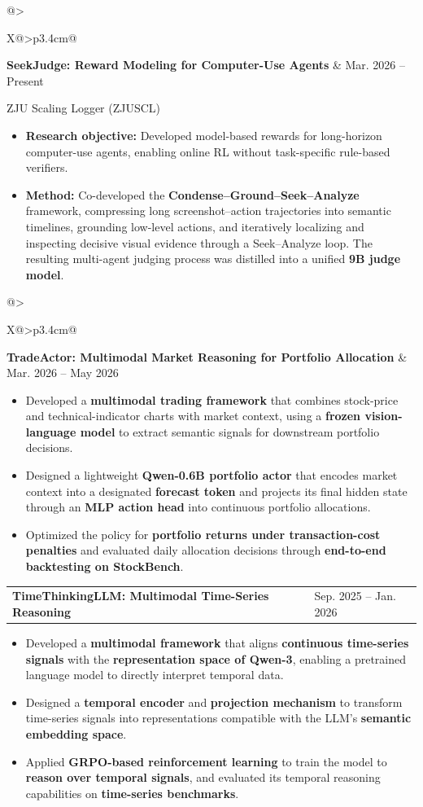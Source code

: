 \documentclass[11pt]{article}
\makeatletter
\newcommand{\cvheading}[2]{%
    \par\noindent
    \begin{tabularx}{\linewidth}{@{}>{\raggedright\arraybackslash}X@{\hspace{0.8em}}>{\raggedleft\arraybackslash}p{3.4cm}@{}}
        \textbf{#1} & {\small\color{CVMuted}#2}
    \end{tabularx}\par\nobreak\vspace{1pt}%
}
\newcommand{\projectheading}[2]{%
    \Needspace{5\baselineskip}%
    \cvheading{#1}{#2}%
}
\newcommand{\affiliation}[1]{%
    {\small\color{CVMuted}#1\par}\nobreak
}
\newcommand{\projectsep}{\par\addvspace{8pt}}
\makeatother
\begin{document}
\projectsep

\projectheading{SeekJudge: Reward Modeling for Computer-Use Agents}{Mar. 2026 -- Present}
\affiliation{ZJU Scaling Logger (ZJUSCL)}
\begin{itemize}
    \item \textbf{Research objective:} Developed model-based rewards for long-horizon computer-use agents, enabling online RL without task-specific rule-based verifiers.
    \item \textbf{Method:} Co-developed the \textbf{Condense--Ground--Seek--Analyze} framework, compressing long screenshot--action trajectories into semantic timelines, grounding low-level actions, and iteratively localizing and inspecting decisive visual evidence through a Seek--Analyze loop. The resulting multi-agent judging process was distilled into a unified \textbf{9B judge model}.
\end{itemize}

\projectsep

\projectheading{TradeActor: Multimodal Market Reasoning for Portfolio Allocation}{Mar. 2026 -- May 2026}
\begin{itemize}
    \item Developed a \textbf{multimodal trading framework} that combines stock-price and technical-indicator charts with market context, using a \textbf{frozen vision-language model} to extract semantic signals for downstream portfolio decisions.
    \item Designed a lightweight \textbf{Qwen-0.6B portfolio actor} that encodes market context into a designated \textbf{forecast token} and projects its final hidden state through an \textbf{MLP action head} into continuous portfolio allocations.
    \item Optimized the policy for \textbf{portfolio returns under transaction-cost penalties} and evaluated daily allocation decisions through \textbf{end-to-end backtesting on StockBench}.
\end{itemize}

\projectsep

\projectheading{TimeThinkingLLM: Multimodal Time-Series Reasoning}{Sep. 2025 -- Jan. 2026}
\begin{itemize}
    \item Developed a \textbf{multimodal framework} that aligns \textbf{continuous time-series signals} with the \textbf{representation space of Qwen-3}, enabling a pretrained language model to directly interpret temporal data.
    \item Designed a \textbf{temporal encoder} and \textbf{projection mechanism} to transform time-series signals into representations compatible with the LLM's \textbf{semantic embedding space}.
    \item Applied \textbf{GRPO-based reinforcement learning} to train the model to \textbf{reason over temporal signals}, and evaluated its temporal reasoning capabilities on \textbf{time-series benchmarks}.
\end{itemize}
\end{document}
